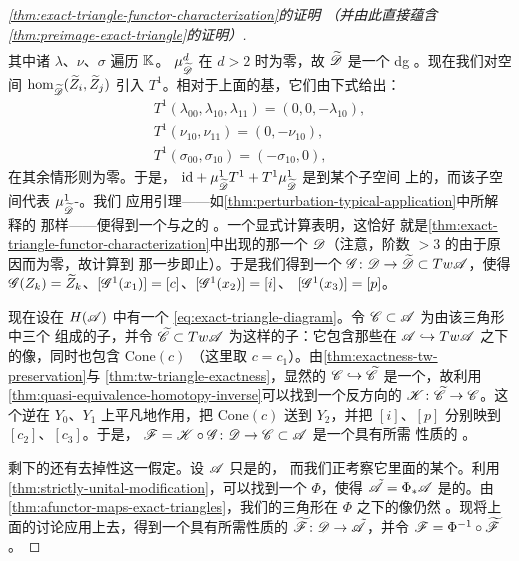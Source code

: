 \begin{proof}[\cref{thm:exact-triangle-functor-characterization}的证明%
（并由此直接蕴含\cref{thm:preimage-exact-triangle}的证明）]
\begin{equation*}
\begin{gathered}
\end{gathered}
\end{equation*}
其中诸 $\lambda$、$\nu$、$\sigma$ 遍历 $\mathbb{K}$。\trComposition{}%
$\mu^d_{\widetilde{\mathscr{D}}}$ 在 $d>2$ 时为零，故 $\widetilde{\mathscr{D}}$ 是一个
dg \trCategory。现在我们对\trMorphism{}空间
$\hom_{\widetilde{\mathscr{D}}}(\widetilde{Z}_i,\widetilde{Z}_j)$ 引入\trEndomorphism{}%
$T^1$。相对于上面的基，它们由下式给出：
\begin{equation*}
\begin{gathered}
T^1(\lambda_{00},\lambda_{10},\lambda_{11})=(0,0,-\lambda_{10}),\\
T^1(\nu_{10},\nu_{11})=(0,-\nu_{10}),\\
T^1(\sigma_{00},\sigma_{10})=(-\sigma_{10},0),
\end{gathered}
\end{equation*}
在其余情形则为零。于是，
$\mathrm{id}+\mu^1_{\widetilde{\mathscr{D}}}T^1+T^1\mu^1_{\widetilde{\mathscr{D}}}$ 是到某个子空间
上的\trProjection，而该子空间代表 $\mu^1_{\widetilde{\mathscr{D}}}$-\trCohomology。我们
应用\trPerturbation{}引理——如\cref{thm:perturbation-typical-application}中所解释的
那样——便得到一个与之\trQuasiisomorphic{}的 \trACategory。一个显式计算表明，这恰好
就是\cref{thm:exact-triangle-functor-characterization}中出现的那一个\trCategory{}%
$\mathscr{D}$（注意，阶数 $>3$ 的\trComposition{}由于\trDegree{}原因而为零，故计算到
那一步即止）。于是我们得到一个 \trAFunctor{}%
$\mathscr{G}\colon\mathscr{D}\to\widetilde{\mathscr{D}}\subset Tw\mathscr{A}$，使得
$\mathscr{G}(Z_k)=\widetilde{Z}_k$、$[\mathscr{G}^1(x_1)]=[c]$、$[\mathscr{G}^1(x_2)]=[i]$、
$[\mathscr{G}^1(x_3)]=[p]$。

现在设在 $H(\mathscr{A})$ 中有一个\trExactTriangle{}
\eqref{eq:exact-triangle-diagram}。令 $\mathscr{C}\subset\mathscr{A}$ 为由该三角形中三个%
\trObject{}组成的\trFull{}子\trCategory，并令 $\widetilde{\mathscr{C}}\subset Tw\mathscr{A}$
为这样的\trFull{}子\trCategory：它包含那些\trObject{}在
$\mathscr{A}\hookrightarrow Tw\mathscr{A}$ 之下的像，同时也包含 $\mathrm{Cone}(c)$
（这里取 $c=c_1$）。由\cref{thm:exactness-tw-preservation}与
\cref{thm:tw-triangle-exactness}，显然的\trEmbedding{}%
$\mathscr{C}\hookrightarrow\widetilde{\mathscr{C}}$ 是一个\trQuasiequivalence，故利用
\cref{thm:quasi-equivalence-homotopy-inverse}可以找到一个反方向的%
\trQuasiequivalence{} $\mathscr{K}\colon\widetilde{\mathscr{C}}\to\mathscr{C}$。这个逆在%
\trObject{} $Y_0$、$Y_1$ 上平凡地作用，把 $\mathrm{Cone}(c)$ 送到 $Y_2$，并把
$[i]$、$[p]$ 分别映到 $[c_2]$、$[c_3]$。于是，
$\mathscr{F}=\mathscr{K}\circ\mathscr{G}\colon\mathscr{D}\to\mathscr{C}\subset\mathscr{A}$ 是一个具有所需
性质的 \trAFunctor。

剩下的还有去掉\trStrictlyUnital{}性这一假定。设 $\mathscr{A}$ 只是\trCunital{}的，
而我们正考察它里面的某个\trExactTriangle。利用
\cref{thm:strictly-unital-modification}，可以找到一个\trFormalDiffeomorphism{}%
$\Phi$，使得 $\tilde{\mathscr{A}}=\Phi_*\mathscr{A}$ 是\trStrictlyUnital{}的。由
\cref{thm:afunctor-maps-exact-triangles}，我们的三角形在 $\Phi$ 之下的像仍然%
\trExact。现将上面的讨论应用上去，得到一个具有所需性质的 \trAFunctor{}%
$\widetilde{\mathscr{F}}\colon\mathscr{D}\to\tilde{\mathscr{A}}$，并令
$\mathscr{F}=\Phi^{-1}\circ\widetilde{\mathscr{F}}$。
\end{proof}

